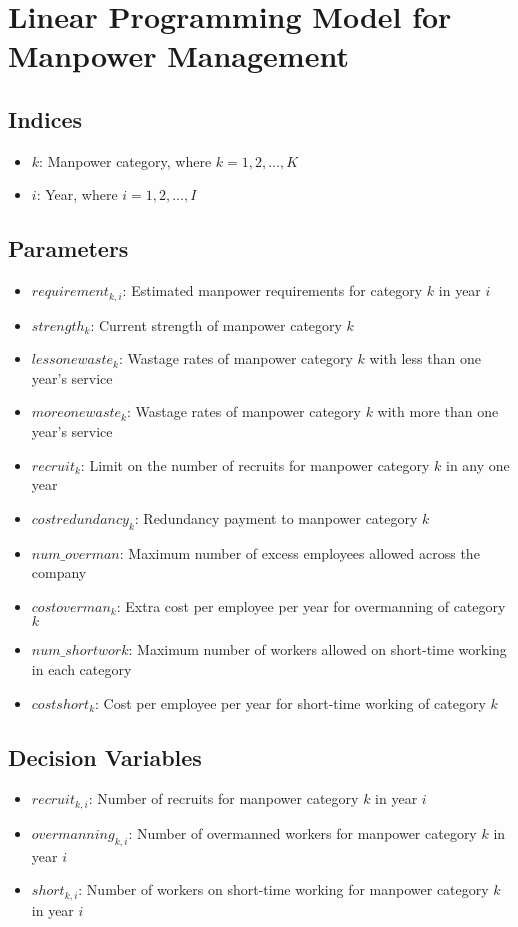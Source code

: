 \documentclass{article}
\begin{document}
\section*{Linear Programming Model for Manpower Management}

\subsection*{Indices}
\begin{itemize}
    \item $k$: Manpower category, where $k = 1, 2, \ldots, K$
    \item $i$: Year, where $i = 1, 2, \ldots, I$
\end{itemize}

\subsection*{Parameters}
\begin{itemize}
    \item $requirement_{k,i}$: Estimated manpower requirements for category $k$ in year $i$
    \item $strength_k$: Current strength of manpower category $k$
    \item $lessonewaste_k$: Wastage rates of manpower category $k$ with less than one year's service
    \item $moreonewaste_k$: Wastage rates of manpower category $k$ with more than one year's service
    \item $recruit_k$: Limit on the number of recruits for manpower category $k$ in any one year
    \item $costredundancy_k$: Redundancy payment to manpower category $k$
    \item $num\_overman$: Maximum number of excess employees allowed across the company
    \item $costoverman_k$: Extra cost per employee per year for overmanning of category $k$
    \item $num\_shortwork$: Maximum number of workers allowed on short-time working in each category
    \item $costshort_k$: Cost per employee per year for short-time working of category $k$
\end{itemize}

\subsection*{Decision Variables}
\begin{itemize}
    \item $recruit_{k,i}$: Number of recruits for manpower category $k$ in year $i$
    \item $overmanning_{k,i}$: Number of overmanned workers for manpower category $k$ in year $i$
    \item $short_{k,i}$: Number of workers on short-time working for manpower category $k$ in year $i$
\end{itemize}
\end{document}
